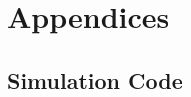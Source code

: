 \documentclass[a4paper,12pt]{article}
\begin{document}
   



\appendix
\section{Appendices}

%

\subsection{Simulation Code}
\end{document}
